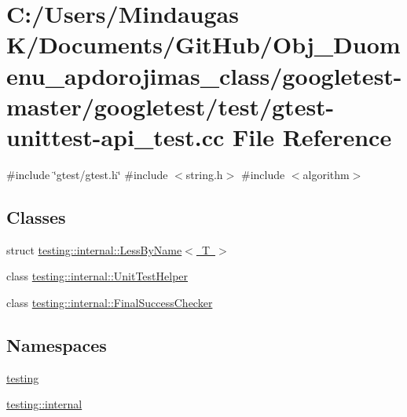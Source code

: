 \hypertarget{googletest-master_2googletest_2test_2gtest-unittest-api__test_8cc}{}\section{C\+:/\+Users/\+Mindaugas K/\+Documents/\+Git\+Hub/\+Obj\+\_\+\+Duomenu\+\_\+apdorojimas\+\_\+class/googletest-\/master/googletest/test/gtest-\/unittest-\/api\+\_\+test.cc File Reference}
\label{googletest-master_2googletest_2test_2gtest-unittest-api__test_8cc}
{\ttfamily \#include \char`\"{}gtest/gtest.\+h\char`\"{}}\newline
{\ttfamily \#include $<$string.\+h$>$}\newline
{\ttfamily \#include $<$algorithm$>$}\newline
\subsection*{Classes}
\begin{DoxyCompactItemize}
\item 
struct \mbox{\hyperlink{structtesting_1_1internal_1_1_less_by_name}{testing\+::internal\+::\+Less\+By\+Name$<$ T $>$}}
\item 
class \mbox{\hyperlink{classtesting_1_1internal_1_1_unit_test_helper}{testing\+::internal\+::\+Unit\+Test\+Helper}}
\item 
class \mbox{\hyperlink{classtesting_1_1internal_1_1_final_success_checker}{testing\+::internal\+::\+Final\+Success\+Checker}}
\end{DoxyCompactItemize}
\subsection*{Namespaces}
\begin{DoxyCompactItemize}
\item 
 \mbox{\hyperlink{namespacetesting}{testing}}
\item 
 \mbox{\hyperlink{namespacetesting_1_1internal}{testing\+::internal}}
\end{DoxyCompactItemize}
